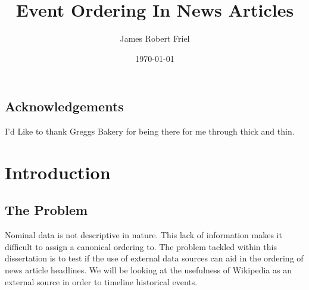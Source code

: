 \documentclass[bsc,frontabs,twoside,singlespacing,parskip,deptreport]{infthesis}     %
\begin{document}
\title{Event Ordering In News Articles}

\author{James Robert Friel}


\date{\today}

\abstract{}


\maketitle

\section*{Acknowledgements}
I'd Like to thank Greggs Bakery for being there for me through thick and thin.

\tableofcontents



\chapter{Introduction}
\section{The Problem}
Nominal data is not descriptive in nature. This lack of information makes it difficult to assign
a canonical ordering to.
The problem tackled within this dissertation is to test if the use of external data sources can
aid in the ordering of news article headlines.
We will be looking at the usefulness of Wikipedia as an external source in order to timeline
historical events.
\end{document}
